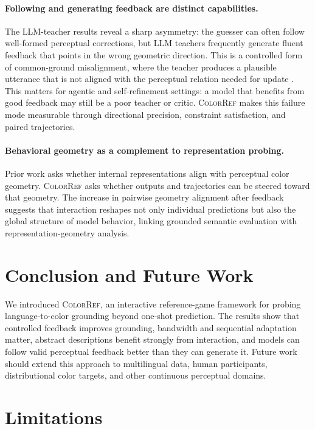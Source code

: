 \documentclass[11pt]{article}
\begin{document}
\paragraph{Following and generating feedback are distinct capabilities.}
The LLM-teacher results reveal a sharp asymmetry: the guesser can often
follow well-formed perceptual corrections, but LLM teachers frequently
generate fluent feedback that points in the wrong geometric direction. This
is a controlled form of common-ground misalignment, where the teacher
produces a plausible utterance that is not aligned with the perceptual
relation needed for update \citep{sarkar2025understanding}. This matters for
agentic and self-refinement settings: a model that benefits from good
feedback may still be a poor teacher or critic. \textsc{ColorRef} makes this
failure mode measurable through directional precision, constraint
satisfaction, and paired trajectories.

\paragraph{Behavioral geometry as a complement to representation probing.}
Prior work asks whether internal representations align with perceptual color
geometry. \textsc{ColorRef} asks whether outputs and trajectories can be
steered toward that geometry. The increase in pairwise geometry alignment
after feedback suggests that interaction reshapes not only individual
predictions but also the global structure of model behavior, linking grounded
semantic evaluation with representation-geometry analysis.





\section{Conclusion and Future Work}
\label{sec:conclusion}
We introduced \textsc{ColorRef}, an interactive reference-game framework for
probing language-to-color grounding beyond one-shot prediction. The results
show that controlled feedback improves grounding, bandwidth and sequential
adaptation matter, abstract descriptions benefit strongly from interaction,
and models can follow valid perceptual feedback better than they can generate
it. Future work should extend this approach to multilingual data, human
participants, distributional color targets, and
other continuous perceptual domains.

\section{Limitations}
\label{sec:limitations}
\end{document}
